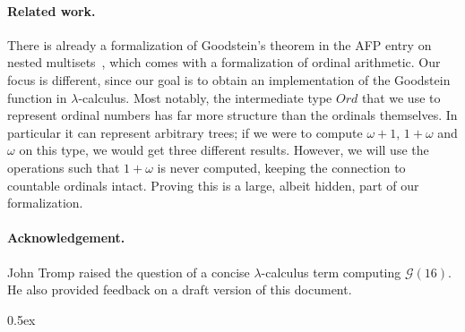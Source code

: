 \documentclass[11pt,a4paper]{article}
\begin{document}
\paragraph{Related work.}
There is already a formalization of Goodstein's theorem in the
AFP entry on nested multisets~\cite{NMO},
which comes with a formalization of ordinal arithmetic.
Our focus is different,
since our goal is to obtain an implementation of the Goodstein function
in $\lambda$-calculus.
Most notably, the intermediate type $\mathit{Ord}$ that we use to
represent ordinal numbers has far more structure than the ordinals themselves.
In particular it can represent arbitrary trees;
if we were to compute $\omega + 1$, $1 + \omega$ and $\omega$ on this type,
we would get three different results.
However, we will use the operations such that $1 + \omega$ is never computed,
keeping the connection to countable ordinals intact.
Proving this is a large, albeit hidden, part of our formalization.

\paragraph{Acknowledgement.}
John Tromp raised the question of a concise $\lambda$-calculus term computing
$\mathcal{G}(16)$.
He also provided feedback on a draft version of this document.

\parindent 0pt\parskip 0.5ex





\end{document}

